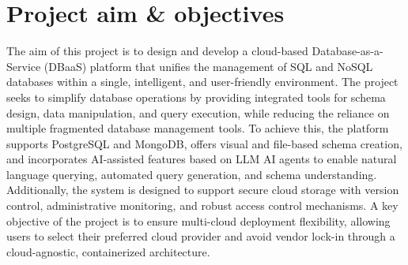 \section{Project aim \& objectives}
The aim of this project is to design and develop a cloud-based Database-as-a-Service (DBaaS) platform that unifies the management of SQL and NoSQL databases within a single, intelligent, and user-friendly environment. The project seeks to simplify database operations by providing integrated tools for schema design, data manipulation, and query execution, while reducing the reliance on multiple fragmented database management tools. To achieve this, the platform supports PostgreSQL and MongoDB, offers visual and file-based schema creation, and incorporates AI-assisted features based on LLM AI agents to enable natural language querying, automated query generation, and schema understanding. Additionally, the system is designed to support secure cloud storage with version control, administrative monitoring, and robust access control mechanisms. A key objective of the project is to ensure multi-cloud deployment flexibility, allowing users to select their preferred cloud provider and avoid vendor lock-in through a cloud-agnostic, containerized architecture.